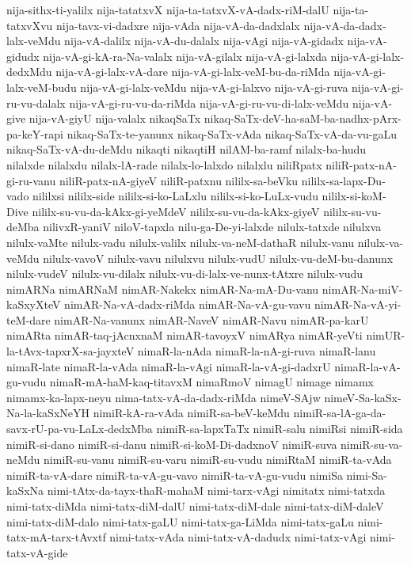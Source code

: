 {nija-sithx-ti-yalilx
nija-tatatxvX
nija-ta-tatxvX-vA-dadx-riM-dalU
nija-ta-tatxvXvu
nija-tavx-vi-dadxre
nija-vAda
nija-vA-da-dadxlalx
nija-vA-da-dadx-lalx-veMdu
nija-vA-dalilx
nija-vA-du-dalalx
nija-vAgi
nija-vA-gidadx
nija-vA-gidudx
nija-vA-gi-kA-ra-Na-valalx
nija-vA-gilalx
nija-vA-gi-lalxda
nija-vA-gi-lalx-dedxMdu
nija-vA-gi-lalx-vA-dare
nija-vA-gi-lalx-veM-bu-da-riMda
nija-vA-gi-lalx-veM-budu
nija-vA-gi-lalx-veMdu
nija-vA-gi-lalxvo
nija-vA-gi-ruva
nija-vA-gi-ru-vu-dalalx
nija-vA-gi-ru-vu-da-riMda
nija-vA-gi-ru-vu-di-lalx-veMdu
nija-vA-give
nija-vA-giyU
nija-valalx
nikaqSaTx
nikaq-SaTx-deV-ha-saM-ba-nadhx-pArx-pa-keY-rapi
nikaq-SaTx-te-yanunx
nikaq-SaTx-vAda
nikaq-SaTx-vA-da-vu-gaLu
nikaq-SaTx-vA-du-deMdu
nikaqti
nikaqtiH
nilAM-ba-ramf
nilalx-ba-hudu
nilalxde
nilalxdu
nilalx-lA-rade
nilalx-lo-lalxdo
nilalxlu
niliRpatx
niliR-patx-nA-gi-ru-vanu
niliR-patx-nA-giyeV
niliR-patxnu
nililx-sa-beVku
nililx-sa-lapx-Du-vado
nililxsi
nililx-side
nililx-si-ko-LaLxlu
nililx-si-ko-LuLx-vudu
nililx-si-koM-Dive
nililx-su-vu-da-kAkx-gi-yeMdeV
nililx-su-vu-da-kAkx-giyeV
nililx-su-vu-deMba
nilivxR-yaniV
niloV-tapxla
nilu-ga-De-yi-lalxde
nilulx-tatxde
nilulxva
nilulx-vaMte
nilulx-vadu
nilulx-valilx
nilulx-va-neM-dathaR
nilulx-vanu
nilulx-va-veMdu
nilulx-vavoV
nilulx-vavu
nilulxvu
nilulx-vudU
nilulx-vu-deM-bu-danunx
nilulx-vudeV
nilulx-vu-dilalx
nilulx-vu-di-lalx-ve-nunx-tAtxre
nilulx-vudu
nimARNa
nimARNaM
nimAR-Nakekx
nimAR-Na-mA-Du-vanu
nimAR-Na-miV-kaSxyXteV
nimAR-Na-vA-dadx-riMda
nimAR-Na-vA-gu-vavu
nimAR-Na-vA-yi-teM-dare
nimAR-Na-vanunx
nimAR-NaveV
nimAR-Navu
nimAR-pa-karU
nimARta
nimAR-taq-jAcnxnaM
nimAR-tavoyxV
nimARya
nimAR-yeVti
nimUR-la-tAvx-tapxrX-sa-jayxteV
nimaR-la-nAda
nimaR-la-nA-gi-ruva
nimaR-lanu
nimaR-late
nimaR-la-vAda
nimaR-la-vAgi
nimaR-la-vA-gi-dadxrU
nimaR-la-vA-gu-vudu
nimaR-mA-haM-kaq-titavxM
nimaRmoV
nimagU
nimage
nimamx
nimamx-ka-lapx-neyu
nima-tatx-vA-da-dadx-riMda
nimeV-SAjw
nimeV-Sa-kaSx-Na-la-kaSxNeYH
nimiR-kA-ra-vAda
nimiR-sa-beV-keMdu
nimiR-sa-lA-ga-da-savx-rU-pa-vu-LaLx-dedxMba
nimiR-sa-lapxTaTx
nimiR-salu
nimiRsi
nimiR-sida
nimiR-si-dano
nimiR-si-danu
nimiR-si-koM-Di-dadxnoV
nimiR-suva
nimiR-su-va-neMdu
nimiR-su-vanu
nimiR-su-varu
nimiR-su-vudu
nimiRtaM
nimiR-ta-vAda
nimiR-ta-vA-dare
nimiR-ta-vA-gu-vavo
nimiR-ta-vA-gu-vudu
nimiSa
nimi-Sa-kaSxNa
nimi-tAtx-da-tayx-thaR-mahaM
nimi-tarx-vAgi
nimitatx
nimi-tatxda
nimi-tatx-diMda
nimi-tatx-diM-dalU
nimi-tatx-diM-dale
nimi-tatx-diM-daleV
nimi-tatx-diM-dalo
nimi-tatx-gaLU
nimi-tatx-ga-LiMda
nimi-tatx-gaLu
nimi-tatx-mA-tarx-tAvxtf
nimi-tatx-vAda
nimi-tatx-vA-dadudx
nimi-tatx-vAgi
nimi-tatx-vA-gide
}
